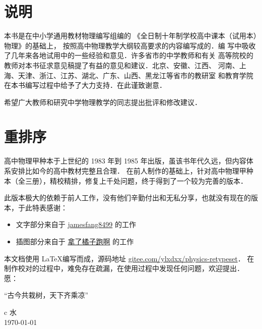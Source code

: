 \chapter{说明}

本书是在中小学通用教材物理编写组编的
《全日制十年制学校高中课本（试用本）物理》的基础上，
按照高中物理教学大纲较高要求的内容编写成的．编
写中吸收了几年来各地试用中的一些经验和意见．许多省市的中学教师和有关
高等院校的教师对本书征求意见稿提了有益的意见和建议．北京、安徽、江西、
河南、上海、天津、浙江、江苏、湖北、广东、山西、黑龙江等省市的教研室
和教育学院在本书编写过程中给予了大力支持．在此谨致谢意．

希望广大教师和研究中学物理教学的同志提出批评和修改建议．


\chapter{重排序}

高中物理甲种本于上世纪的 1983 年到 1985 年出版，虽该书年代久远，但内容体系安排比如今的高中教材完整且合理．
在前人制作的基础上，针对高中物理甲种本（全三册），精校精排，修复上千处问题，终于得到了一个较为完善的版本．

此版本极大的依赖于前人工作，没有他们辛勤付出和无私分享，也就没有现在的版本，于此特表感谢：
\begin{itemize}
	\item
	文字部分来自于 \href{https://github.com/jamesfang8499}{jamesfang8499}
	的工作
	\item
	插图部分来自于
	\href{https://www.latexstudio.net/index/lists/barsearch/author/1077.html}{拿了橘子跑啊}
	的工作
\end{itemize}
本文档使用 \LaTeX 编写而成，源码地址 \href{https://gitee.com/ylxdxx/physics-retypeset}{gitee.com/ylxdxx/physics-retypeset}．
在制作校对的过程中，难免存在疏漏，在使用过程中发现任何问题，欢迎提出．
愿：
\begin{center}
	\kaishu 
	\vspace*{0.5cm}
	“古今共栽树，天下齐乘凉”
	\vspace*{0.3cm}
\end{center}
\begin{center}
	\flushright
	\begin{tblr}{c}
		水   \\
		\today
	\end{tblr}
\end{center}

